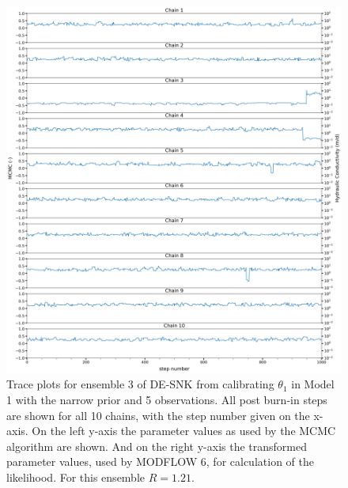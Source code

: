 \begin{figure}[ht]
\centering
\includegraphics[width=1.0\textwidth]{Figures/appendix_figs/trace_plots_ensemble3_DEsnooker priornarrow.png}
\caption{Trace plots for ensemble 3 of DE-SNK from calibrating  $\theta_1$ in Model 1 with the narrow prior and 5 observations. All post burn-in steps are shown for all 10 chains, with the step number given on the x-axis. On the left y-axis the parameter values as used by the MCMC algorithm are shown. And on the right y-axis the transformed parameter values, used by MODFLOW 6, for calculation of the likelihood. For this ensemble $\hat{R}=1.21$.}\label{traceplot_DE-SNK_priornarrow}
\end{figure}


